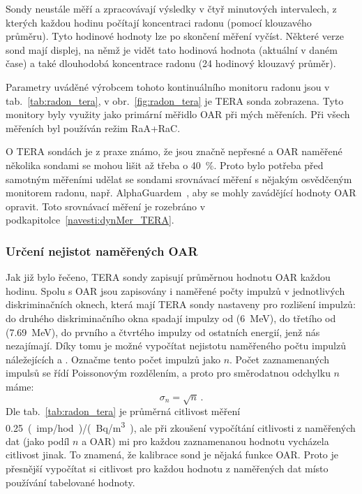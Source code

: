 Sondy neustále měří a zpracovávají výsledky v čtyř minutových intervalech, z kterých každou hodinu počítají koncentraci radonu (pomocí klouzavého průměru). Tyto hodinové hodnoty lze po skončení měření vyčíst. Některé verze sond mají displej, na němž je vidět tato hodinová hodnota (aktuální v daném čase) a také dlouhodobá koncentrace radonu (24 hodinový klouzavý průměr). \cite{tera}

Parametry uváděné výrobcem tohoto kontinuálního monitoru radonu jsou v tab.~\ref{tab:radon_tera}, v obr.~\ref{fig:radon_tera} je TERA sonda zobrazena. Tyto monitory byly využity jako primární měřidlo OAR při mých měřeních. Při všech měřeních byl používán režim RaA+RaC.

O TERA sondách je z praxe známo, že jsou značně nepřesné a OAR naměřené několika sondami se mohou lišit až třeba o 40~\%. Proto bylo potřeba před samotným měřeními udělat se sondami srovnávací měření s nějakým osvědčeným monitorem radonu, např. AlphaGuardem~\cite{alphaguard}, aby se mohly zavádějící hodnoty OAR opravit. Toto srovnávací měření je rozebráno v podkapitolce~\ref{navesti:dynMer_TERA}.

\subsubsection{Určení nejistot naměřených OAR}
Jak již bylo řečeno, TERA sondy zapisují průměrnou hodnotu OAR každou hodinu. Spolu s OAR jsou zapisovány i naměřené počty impulzů v jednotlivých diskriminačních oknech, která mají TERA sondy nastaveny pro rozlišení impulzů: do druhého diskriminačního okna spadají impulzy od  (\SI{6}{MeV}), do třetího od  (\SI{7.69}{MeV}), do prvního a čtvrtého impulzy od ostatních energií, jenž nás nezajímají. Díky tomu je možné vypočítat nejistotu naměřeného počtu impulzů náležejících  a . Označme tento počet impulzů jako $n$. Počet zaznamenaných impulsů se řídí Poissonovým rozdělením, a proto pro směrodatnou odchylku $n$ máme:
\begin{equation}
    \sigma_n=\sqrt{n}\,.
    \label{eq:radon_n_odchylka}
\end{equation}
Dle tab.~\ref{tab:radon_tera} je průměrná citlivost měření \SI{0.25}{(imp/hod)/(Bq/m^3)}, ale při zkoušení vypočítání citlivosti z naměřených dat (jako podíl $n$ a OAR) mi pro každou zaznamenanou hodnotu vycházela citlivost jinak. To znamená, že kalibrace sond je nějaká funkce OAR. Proto je přesnější vypočítat si citlivost pro každou hodnotu z naměřených dat místo používání tabelované hodnoty.

